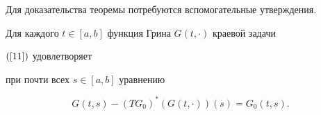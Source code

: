 Для доказательства теоремы потребуются вспомогательные утверждения.





\begin{lems}


\label{l1}


Для каждого $t\in[a,b]$ функция Грина $G(t,\cdot)$ краевой задачи


$(\ref{11})$ удовлетворяет


при почти всех $s\in[a,b]$ уравнению


\begin{equation}\label{g1}


G(t,s)-(TG_0)^*(G(t,\cdot))(s)=G_0(t,s).


\end{equation}


\end{lems}






